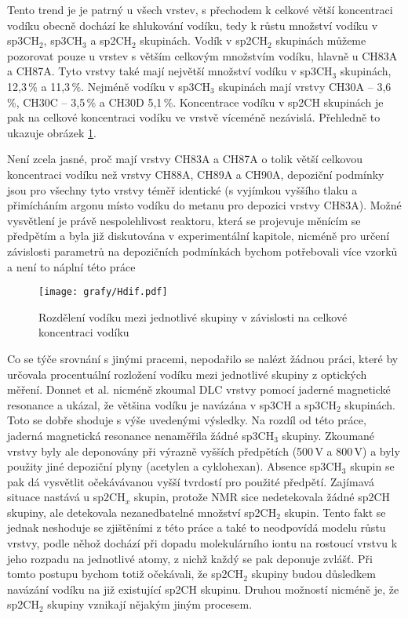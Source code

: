 Tento trend je je patrný u všech vrstev, s přechodem k celkové větší koncentraci vodíku obecně dochází ke shlukování vodíku, tedy k růstu množství vodíku v sp3CH$_2$, sp3CH$_3$ a sp2CH$_2$ skupinách. Vodík v sp2CH$_2$ skupinách můžeme pozorovat pouze u vrstev s větším celkovým množstvím vodíku, hlavně u CH83A a CH87A. Tyto vrstvy také mají největší množství vodíku v sp3CH$_3$ skupinách, 12,3\,\% a 11,3\,\%. Nejméně vodíku v sp3CH$_3$ skupinách mají vrstvy CH30A -- 3,6\,\%, CH30C -- 3,5\,\% a CH30D 5,1\,\%. Koncentrace vodíku v sp2CH skupinách je pak na celkové koncentraci vodíku ve vrstvě víceméně nezávislá. Přehledně to ukazuje obrázek \ref{Hdif}.

Není zcela jasné, proč mají vrstvy CH83A a CH87A o tolik větší celkovou koncentraci vodíku než vrstvy CH88A, CH89A a CH90A, depoziční podmínky jsou pro všechny tyto vrstvy téměř identické (s vyjímkou vyššího tlaku a přimícháním argonu místo vodíku do metanu pro depozici vrstvy CH83A). 
Možné vysvětlení je právě nespolehlivost reaktoru, která se projevuje měnícím se předpětím a byla již diskutována v experimentální kapitole, nicméně pro určení závislosti parametrů na depozičních podmínkách bychom potřebovali více vzorků a není to náplní této práce

\begin{figure}[tbhp]
	\texttt{[image: grafy/Hdif.pdf]}
	\caption{Rozdělení vodíku mezi jednotlivé skupiny v závislosti na celkové koncentraci vodíku}
	\label{Hdif}
\end{figure}

Co se týče srovnání s jinými pracemi, nepodařilo se nalézt žádnou práci, které by určovala procentuální rozložení vodíku mezi jednotlivé skupiny z optických měření. Donnet et al. \cite{Donnet1999} nicméně zkoumal DLC vrstvy pomocí jaderné magnetické resonance a ukázal, že většina vodíku je navázána v sp3CH a sp3CH$_2$ skupinách. 
Toto se dobře shoduje s výše uvedenými výsledky. Na rozdíl od této práce, jaderná magnetická resonance nenaměřila žádné sp3CH$_3$ skupiny. Zkoumané vrstvy byly ale deponovány při výrazně vyšších předpětích (500\,V a 800\,V) a byly použity jiné depoziční plyny (acetylen a cyklohexan). Absence sp3CH$_3$ skupin se pak dá vysvětlit očekávávanou vyšší tvrdostí pro použité předpětí. Zajímavá situace nastává u sp2CH$_x$ skupin, protože NMR sice nedetekovala žádné sp2CH skupiny, ale detekovala nezanedbatelné množství sp2CH$_2$ skupin. 
Tento fakt se jednak neshoduje se zjištěními z této práce a také to neodpovídá modelu růstu vrstvy, podle něhož dochází při dopadu molekulárního iontu na rostoucí vrstvu k jeho rozpadu na jednotlivé atomy, z nichž každý se pak deponuje zvlášť. Při tomto postupu bychom totiž očekávali, že sp2CH$_2$ skupiny budou důsledkem navázání vodíku na již existující sp2CH skupinu. Druhou možností nicméně je, že sp2CH$_2$ skupiny vznikají nějakým jiným procesem.

